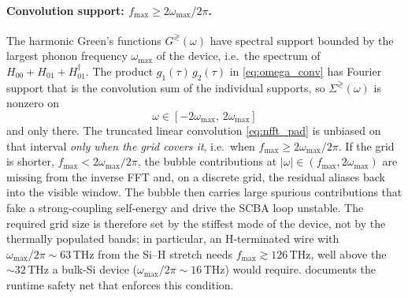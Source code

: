 \paragraph{Convolution support: $f_{\max}\!\ge\!2\omega_{\max}/2\pi$.}
The harmonic Green's functions $G^{\gtrless}(\omega)$ have spectral
support bounded by the largest phonon frequency $\omega_{\max}$ of the
device, i.e.\ the spectrum of
$H_{00}+H_{01}+H_{01}^{\dagger}$. The product
$g_1(\tau)\,g_2(\tau)$ in \cref{eq:omega_conv} has Fourier support
that is the convolution sum of the individual supports, so
$\Sigma^{\gtrless}(\omega)$ is nonzero on
\begin{equation}\label{eq:conv_support}
  \omega\in[-2\omega_{\max},\,2\omega_{\max}]
\end{equation}
and only there. The truncated linear convolution \cref{eq:nfft_pad} is
unbiased on that interval \emph{only when the grid covers it}, i.e.\
when $f_{\max}\ge 2\omega_{\max}/2\pi$. If the grid is shorter,
$f_{\max}<2\omega_{\max}/2\pi$, the bubble contributions at
$|\omega|\in(f_{\max},2\omega_{\max})$ are missing from the inverse
FFT and, on a discrete grid, the residual aliases back into the
visible window. The bubble then carries large spurious contributions
that fake a strong-coupling self-energy and drive the SCBA loop
unstable. The required grid size is therefore set by the stiffest
mode of the device, not by the thermally populated bands; in
particular, an H-terminated wire with $\omega_{\max}/2\pi\sim 63$\,THz
from the Si--H stretch needs $f_{\max}\gtrsim 126$\,THz, well above the
$\sim 32$\,THz a bulk-Si device ($\omega_{\max}/2\pi\sim 16$\,THz) would require. 
documents the runtime safety net that enforces this condition.


